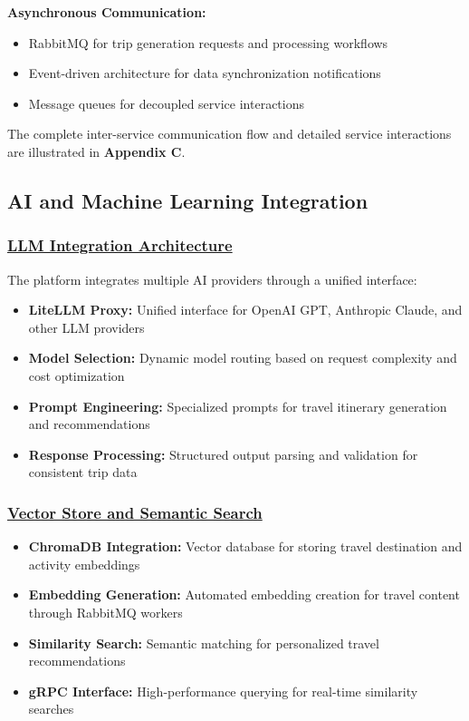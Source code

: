 \textbf{Asynchronous Communication:}
\begin{itemize}
    \item RabbitMQ for trip generation requests and processing workflows
    \item Event-driven architecture for data synchronization notifications
    \item Message queues for decoupled service interactions
\end{itemize}

The complete inter-service communication flow and detailed service interactions are illustrated in \textbf{Appendix C}.

\subsection{AI and Machine Learning Integration}

\subsubsection*{\underline{LLM Integration Architecture}}
The platform integrates multiple AI providers through a unified interface:

\begin{itemize}
    \item \textbf{LiteLLM Proxy:} Unified interface for OpenAI GPT, Anthropic Claude, and other LLM providers
    \item \textbf{Model Selection:} Dynamic model routing based on request complexity and cost optimization
    \item \textbf{Prompt Engineering:} Specialized prompts for travel itinerary generation and recommendations
    \item \textbf{Response Processing:} Structured output parsing and validation for consistent trip data
\end{itemize}

\subsubsection*{\underline{Vector Store and Semantic Search}}
\begin{itemize}
    \item \textbf{ChromaDB Integration:} Vector database for storing travel destination and activity embeddings
    \item \textbf{Embedding Generation:} Automated embedding creation for travel content through RabbitMQ workers
    \item \textbf{Similarity Search:} Semantic matching for personalized travel recommendations
    \item \textbf{gRPC Interface:} High-performance querying for real-time similarity searches
\end{itemize}

